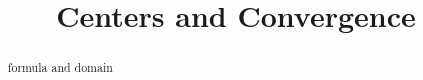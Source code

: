\documentclass{ximera}
\title{Centers and Convergence}
\begin{document}
\begin{abstract}
formula and domain
\end{abstract}
\maketitle
\end{document}
